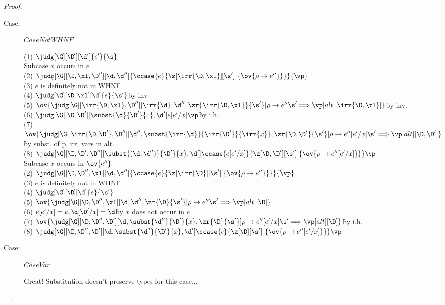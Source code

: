 \begin{proof}
\begin{description}
\item[Case:] $CaseNotWHNF$
\begin{tabbing}
  (1) $\judg[\G][\D'][\d']{e'}{\s}$\\
  Subcase $x$ occurs in $e$\\
    (2) $\judg[\G][\D,\xl,\D''][\d,\d'']{\ccase{e}{\z[\irr{\D,\xl}][\s']~\{\ov{\rho\to e''}\}}}{\vp}$\\
    (3) $e$ is definitely not in WHNF\\
    (4) $\judg[\G][\D,\xl][\d]{e}{\s'}$\`by inv.\\
    (5) $\ov{\judg[\G][\irr{\D,\xl},\D''][\irr{\d},\d'',\zr{\irr{\D,\xl}}{\s'}]{\rho\to e''}{\s' \Longrightarrow \vp}[alt][\irr{\D,\xl}]}$\`by inv.\\
    (6) $\judg[\G][\D,\D'][\subst{\d}{\D'}{x}, \d']{e[e'/x]}{\vp}$\`by i.h.\\
    (7) $\ov{\judg[\G][\irr{\D,\D'},\D''][\d'',\subst{\irr{\d}}{\irr{\D'}}{\irr{x}},\zr{\D,\D'}{\s'}]{\rho\to e''[e'/x]}{\s' \Longrightarrow \vp}[alt][\D,\D']}$\` by subst. of p. irr. vars in alt.\\
    (8) $\judg[\G][\D,\D',\D''][\subst{(\d,\d'')}{\D'}{x},\d']{\ccase{e[e'/x]}{\z[\D,\D'][\s']~\{\ov{\rho\to e''[e'/x]}\}}}{\vp}$\\
  Subcase $x$ occurs in $\ov{e''}$\\
    (2) $\judg[\G][\D,\D'',\xl][\d,\d'']{\ccase{e}{\z[\irr{\D}][\s']~\{\ov{\rho\to e''}\}}}{\vp}$\\
    (3) $e$ is definitely not in WHNF\\
    (4) $\judg[\G][\D][\d]{e}{\s'}$\\
    (5) $\ov{\judg[\G][\D,\D'',\xl][\d,\d'',\zr{\D}{\s'}]{\rho\to e''}{\s' \Longrightarrow \vp}[alt][\D]}$\\
    (6) $e[e'/x] = e, \d[\D'/x]=\d$\` by $x$ does not occur in $e$\\
    (7) $\ov{\judg[\G][\D,\D'',\D'][\d,\subst{\d''}{\D'}{x},\zr{\D}{\s'}]{\rho\to e''[e'/x]}{\s' \Longrightarrow \vp}[alt][\D]}$\`by i.h.\\
    (8) $\judg[\G][\D,\D'',\D'][\d,\subst{\d''}{\D'}{x},\d']{\ccase{e}{\z[\D][\s']~\{\ov{\rho\to e''[e'/x]}\}}}{\vp}$\\
\end{tabbing}

\item[Case:] $CaseVar$
\begin{tabbing}
    Great! Substitution doesn't preserve types for this case...
\end{tabbing}


\end{description}
\end{proof}

